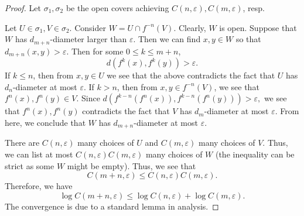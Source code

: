 \documentclass[12pt]{article}
\theoremstyle{definition}
\theoremstyle{remark}
\begin{document}
\begin{proof}
    Let $\sigma_1,\sigma_2$ be the open covers achieving $C(n,\varepsilon), C(m,\varepsilon)$, resp.

    Let $U\in \sigma_1, V\in \sigma_2$. Consider $W=U\cap f^{-n}(V).$ Clearly, $W$ is open. Suppose that $W$ has $d_{m+n}$-diameter larger than $\varepsilon$. Then we can find $x,y\in W$ so that $d_{m+n}(x,y)>\varepsilon$. Then for some $0\leq k\leq m+n$, 
    \[
    d(f^k(x),f^k(y))>\varepsilon.
    \]
    If $k\leq n$, then from $x,y\in U$ we see that the above contradicts the fact that $U$ has $d_n$-diameter at most $\varepsilon$. If $k>n$, then from $x,y\in f^{-n}(V)$, we see that $f^n(x),f^{n}(y)\in V$. Since $d(f^{k-n}(f^n(x)),f^{k-n}(f^n(y)))>\varepsilon,$ we see that $f^{n}(x), f^{n}(y)$ contradicts the fact that $V$ has $d_m$-diameter at most $\varepsilon.$ From here, we conclude that $W$ has $d_{m+n}$-diameter at most $\varepsilon$.

    There are $C(n,\varepsilon)$ many choices of $U$ and $C(m,\varepsilon)$ many choices of $V$. Thus, we can list at most $C(n,\varepsilon)C(m,\varepsilon)$ many choices of $W$ (the inequality can be strict as some $W$ might be empty). Thus, we see that
    \[
    C(m+n,\varepsilon)\leq C(n,\varepsilon)C(m,\varepsilon).
    \]
    Therefore, we have
    \[
    \log C(m+n,\varepsilon)\leq  \log C(n,\varepsilon)+\log C(m,\varepsilon).
    \]
    The convergence is due to a standard lemma in analysis.
\end{proof}
\end{document}
